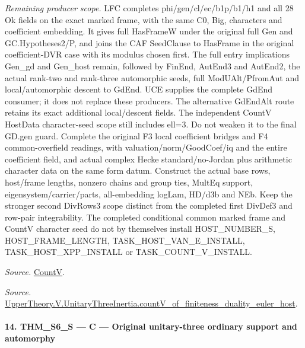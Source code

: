 \emph{Remaining producer scope.} LFC completes phi/gen/cl/ec/b1p/b1/h1 and all 28 Ok fields on the exact marked frame, with the same C0, Big, characters and coefficient embedding. It gives full HasFrameW under the original full Gen and GC.Hypotheses2/P, and joins the CAF SeedClause to HasFrame in the original coefficient-DVR case with its modulus chosen first. The full entry implications Gen\_\allowbreak gd and Gen\_\allowbreak host remain, followed by FinEnd, AutEnd3 and AutEnd2, the actual rank-two and rank-three automorphic seeds, full ModUAlt/PfromAut and local/automorphic descent to GdEnd. UCE supplies the complete GdEnd consumer; it does not replace these producers. The alternative GdEndAlt route retains its exact additional local/descent fields. The independent CountV HostData character-seed scope still includes ell=3. Do not weaken it to the final GD.gen guard. Complete the original F3 local coefficient bridges and F4 common-overfield readings, with valuation/norm/GoodCoef/iq and the entire coefficient field, and actual complex Hecke standard/no-Jordan plus arithmetic character data on the same form datum. Construct the actual base rows, host/frame lengths, nonzero chains and group ties, MultEq support, eigensystem/carrier/parts, all-embedding logLam, HD/d3b and NEb. Keep the stronger second DivRows3 scope distinct from the completed first DivDef3 and row-pair integrability. The completed conditional common marked frame and CountV character seed do not by themselves install HOST\_\allowbreak NUMBER\_\allowbreak S, HOST\_\allowbreak FRAME\_\allowbreak LENGTH, TASK\_\allowbreak HOST\_\allowbreak VAN\_\allowbreak E\_\allowbreak INSTALL, TASK\_\allowbreak HOST\_\allowbreak XPP\_\allowbreak INSTALL or TASK\_\allowbreak COUNT\_\allowbreak V\_\allowbreak INSTALL.

\emph{Source.} \href{https://github.com/CocoSgt/riemann-hypothesis-lean/blob/7cbf7a0c32fca1badf05931879a37c3f8a2b03b4/src/Development/AutomorphicArithmetic/AutomorphicVarieties/HeightAndVanishing/Counts.lean#L69-L69}{CountV}.

\emph{Source.} \href{https://github.com/CocoSgt/riemann-hypothesis-lean/blob/7cbf7a0c32fca1badf05931879a37c3f8a2b03b4/src/Development/AutomorphicArithmetic/AutomorphicVarieties/ModularityArgument/ThresholdArguments/DenseThresholdCases/CountVOf.lean#L33-L60}{UpperTheory.V.UnitaryThreeInertia.countV\_\allowbreak of\_\allowbreak finiteness\_\allowbreak duality\_\allowbreak euler\_\allowbreak host}.



\paragraph{14. THM\_\allowbreak S6\_\allowbreak S — C — Original unitary-three ordinary support and automorphy}

